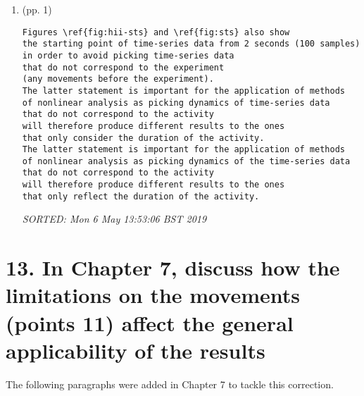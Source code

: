 \documentclass[12pt]{article}
\begin{document}


\begin{enumerate}

\item  (pp. 1)  

	\begin{verbatim}
Figures \ref{fig:hii-sts} and \ref{fig:sts} also show 
the starting point of time-series data from 2 seconds (100 samples) 
in order to avoid picking time-series data 
that do not correspond to the experiment 
(any movements before the experiment).
The latter statement is important for the application of methods
of nonlinear analysis as picking dynamics of time-series data 
that do not correspond to the activity
will therefore produce different results to the ones 
that only consider the duration of the activity. 
The latter statement is important for the application of methods
of nonlinear analysis as picking dynamics of the time-series data 
that do not correspond to the activity
will therefore produce different results to the ones 
that only reflect the duration of the activity. 
	\end{verbatim}
	\textit{
	SORTED:  Mon  6 May 13:53:06 BST 2019
	}
	\\


\end{enumerate}



\section*{13. 
In Chapter 7, discuss how the limitations 
on the movements (points 11) affect the 
general applicability of the results
}


The following paragraphs were added in Chapter 7 
to tackle this correction.
\end{document}
